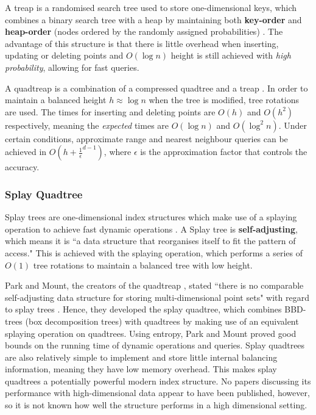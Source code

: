 A treap is a randomised search tree used to store one-dimensional keys, which combines a binary search tree with a heap by maintaining both \textbf{key-order} and \textbf{heap-order} (nodes ordered by the randomly assigned probabilities) \cite{quadtreap}. The advantage of this structure is that there is little overhead when inserting, updating or deleting points and $O(\log n)$ height is still achieved with \textit{high probability}, allowing for fast queries.

A quadtreap is a combination of a compressed quadtree and a treap \cite{quadtreap}. In order to maintain a balanced height $h \approx \log n$ when the tree is modified, tree rotations are used. The times for inserting and deleting points are $O(h)$ and $O(h^2)$ respectively, meaning the \textit{expected} times are $O(\log n)$ and $O(\log^2 n)$. Under certain conditions, approximate range and nearest neighbour queries can be achieved in $O(h + \frac{1}{\epsilon}^{d - 1})$, where $\epsilon$ is the approximation factor that controls the accuracy.

\subsubsection{Splay Quadtree}


Splay trees are one-dimensional index structures which make use of a splaying operation to achieve fast dynamic operations \cite{introduction-to-algorithms}. A Splay tree is \textbf{self-adjusting}, which means it is ``a data structure that reorganises itself to fit the pattern of access." \cite{splay-quadtree} This is achieved with the splaying operation, which performs a series of $O(1)$ tree rotations to maintain a balanced tree with low height.

Park and Mount, the creators of the quadtreap \cite{quadtreap}, stated ``there is no comparable self-adjusting data structure for storing multi-dimensional point sets" with regard to splay trees \cite{splay-quadtree}. Hence, they developed the splay quadtree, which combines BBD-trees (box decomposition trees) with quadtrees by making use of an equivalent splaying operation on quadtrees. Using entropy, Park and Mount proved good bounds on the running time of dynamic operations and queries. Splay quadtrees are also relatively simple to implement and store little internal balancing information, meaning they have low memory overhead. This makes splay quadtrees a potentially powerful modern index structure. No papers discussing its performance with high-dimensional data appear to have been published, however, so it is not known how well the structure performs in a high dimensional setting.

